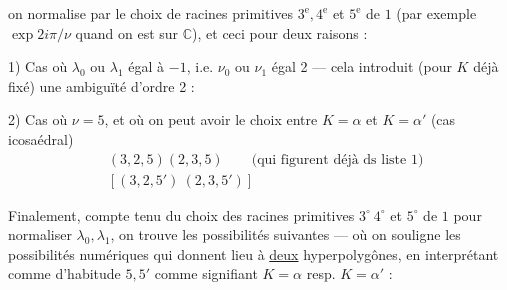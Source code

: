 on normalise  par le choix de racines primitives $3^{\mathrm e},4^{\mathrm e}$ et $5^{\mathrm e}$ de $1$ (par exemple $\exp 2i\pi/\nu$ quand on est sur $\mathbb C$), et ceci pour deux raisons :

1) Cas où $\lambda_0$ ou $\lambda_1$  égal à $-1$, i.e. $\nu_0$ ou $\nu_1$ égal 2 --- cela introduit (pour $K$ déjà fixé) une ambiguïté d'ordre 2 :


2) Cas où $\nu=5$, et où on peut avoir le choix entre $K=\alpha$ et $K=\alpha'$ (cas icosaédral)
\[
\begin{aligned}
&(3,2,5)(2,3,5)\qquad\text{(qui figurent déjà ds liste 1)}\\
&[(3,2,5')\ (2,3,5')]
\end{aligned}
\]

Finalement, compte tenu du choix des racines primitives $3^\circ\ 4^\circ$ et $5^\circ$ de $1$ pour normaliser $\lambda_0,\lambda_1$, on trouve les possibilités suivantes --- où on souligne les possibilités numériques qui donnent lieu à \uline{deux} hyperpolygônes, en interprétant comme d'habitude $5,5'$ comme signifiant $K=\alpha$ resp. $K=\alpha'$ :
